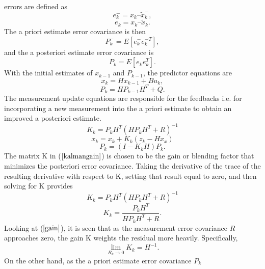\documentclass[a4paper,10pt]{report}
\begin{document}
errors are defined as
\begin{equation}
e_k^- = x_k – \tilde x_k^- ,
\end{equation}
\begin{equation}
e_k =  x_k – \tilde x_k.
\end{equation}
The a priori estimate error covariance is then
\begin{equation}
P_k^- = E[ e_k^- e_k^{-T} ],
\end{equation}
and the a posteriori estimate error covariance is
\begin{equation}
P_k = E[e_k e_k^T].
\end{equation}
With the initial estimates of $x_{k-1}$ and $P_{k-1}$, the predictor equations are
\begin{equation}
x_k = Hx_{k-1} + Bu_k,
\end{equation}
\begin{equation}
P_k = HP_{k-1}H^T + Q.
\end{equation}
The measurement update equations are responsible for the feedbacks
i.e. for incorporating a new measurement into the a priori estimate
to obtain an improved a posteriori estimate.
\begin{equation}
K_k = P_kH^T(HP_kH^T + R)^{-1} \label{kalmangain}
\end{equation}
\begin{equation}
x_k = x_k + K_k(z_k - Hx_x)
\end{equation}
\begin{equation}
P_k = (I-K_kH)P_k.
\end{equation}
The matrix K in ($\ref{kalmangain}$) is
chosen to be the gain or blending factor that minimizes the
posteriori error covariance. Taking the derivative of the trace of
the resulting derivative with respect to K, setting that result equal to zero, and
then solving for K provides
\begin{equation}
K_k = P_kH^{T}(HP_kH^{T} + R)^{-1}
\end{equation}
\begin{equation}
K_k = \dfrac{P_kH^T}{HP_kH^T + R}. \label{gain}
\end{equation}
Looking at ($\ref{gain}$), it is seen that as the measurement error
covariance $R$ approaches zero, the gain K weights the residual more
heavily. Specifically,
\begin{equation}
\mathop {\lim }\limits_{R_k \to 0 } {K_k} = H^{-1}.
\end{equation}
On the other hand, as the a priori estimate error covariance $P_k$
\end{document}
